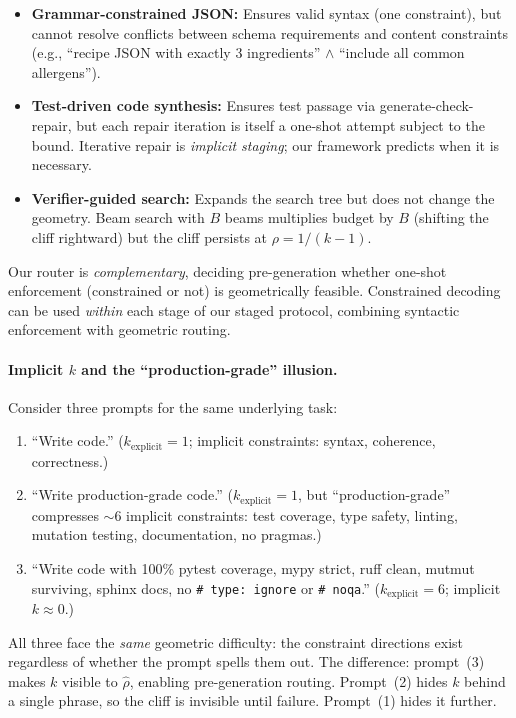 \documentclass{article}
\theoremstyle{plain}
\theoremstyle{definition}
\theoremstyle{remark}
\newcommand{\rhohat}{\hat{\rho}}
\begin{document}
\begin{itemize}[nosep]
\item \textbf{Grammar-constrained JSON:} Ensures valid syntax (one constraint), but cannot resolve conflicts between schema requirements and content constraints (e.g., ``recipe JSON with exactly 3 ingredients'' $\wedge$ ``include all common allergens'').
\item \textbf{Test-driven code synthesis:} Ensures test passage via generate-check-repair, but each repair iteration is itself a one-shot attempt subject to the bound. Iterative repair is \emph{implicit staging}; our framework predicts when it is necessary.
\item \textbf{Verifier-guided search:} Expands the search tree but does not change the geometry. Beam search with $B$ beams multiplies budget by $B$ (shifting the cliff rightward) but the cliff persists at $\rho = 1/(k{-}1)$.
\end{itemize}

\noindent Our router is \emph{complementary}, deciding pre-generation whether one-shot enforcement (constrained or not) is geometrically feasible. Constrained decoding can be used \emph{within} each stage of our staged protocol, combining syntactic enforcement with geometric routing.

\paragraph{Implicit $k$ and the ``production-grade'' illusion.}
Consider three prompts for the same underlying task:
\begin{enumerate}[nosep]
\item ``Write code.'' \quad ($k_{\text{explicit}}{=}1$; implicit constraints: syntax, coherence, correctness.)
\item ``Write production-grade code.'' \quad ($k_{\text{explicit}}{=}1$, but ``production-grade'' compresses ${\sim}6$ implicit constraints: test coverage, type safety, linting, mutation testing, documentation, no pragmas.)
\item ``Write code with 100\% pytest coverage, mypy strict, ruff clean, mutmut surviving, sphinx docs, no \texttt{\# type: ignore} or \texttt{\# noqa}.'' \quad ($k_{\text{explicit}}{=}6$; implicit $k{\approx}0$.)
\end{enumerate}
All three face the \emph{same} geometric difficulty: the constraint directions exist regardless of whether the prompt spells them out. The difference: prompt~(3) makes $k$ visible to $\rhohat$, enabling pre-generation routing. Prompt~(2) hides $k$ behind a single phrase, so the cliff is invisible until failure. Prompt~(1) hides it further.
\end{document}

